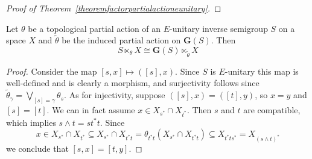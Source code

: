 \begin{proof}[Proof of Theorem~\ref{theoremfactorpartialactioneunitary}]

%

\end{proof}


\begin{proposition}\label{prop:eunitarygroupoidofgerms}
Let $\theta$ be a topological partial action of an $E$-unitary inverse semigroup $S$ on a space $X$ and $\widetilde{\theta}$ be the induced partial action on $\mathbf{G}(S)$. Then
\[S\ltimes_\theta X\cong \mathbf{G}(S)\ltimes_{\widetilde{\theta}} X\]
\end{proposition}
\begin{proof}
Consider the map $[s,x]\mapsto ([s],x)$. Since $S$ is $E$-unitary this map is well-defined and is clearly a morphism, and surjectivity follows since $\widetilde{\theta}_{\gamma}=\bigvee_{[s]=\gamma}\theta_s$. As for injectivity, suppose $([s],x)=([t],y)$, so $x=y$ and $[s]=[t]$. We can in fact assume $x\in X_{s^*}\cap X_{t^*}$. Then $s$ and $t$ are compatible, which implies $s\land t=st^*t$. Since
\[x\in X_{s^*}\cap X_{t^*}\subseteq X_{s^*}\cap X_{t^*t}=\theta_{t^*t}(X_{s^*}\cap X_{t^*t})\subseteq X_{t^*ts^*}=X_{(s\land t)^*}\]
we conclude that $[s,x]=[t,y]$.\qedhere
\end{proof}

